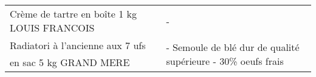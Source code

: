 \begin{longtable}{p{5cm}p{10cm}}
                                                             Crème de tartre en boîte 1 kg LOUIS FRANCOIS &                                                                                                                                                                                                                                                                                                                                                                                                                                                                                                                                                                                                                                                                                                                                                                                                                                                                                                                                                                                                                                        - \\
                                                 Radiatori à l'ancienne aux 7 ufs en sac 5 kg GRAND MERE &                                                                                                                                                                                                                                                                                                                                                                                                                                                                                                                                                                                                                                                                                                                                                                                                                                                                                                                                                                            - Semoule de blé dur de qualité supérieure  - 30\% oeufs frais \\

\end{longtable}
